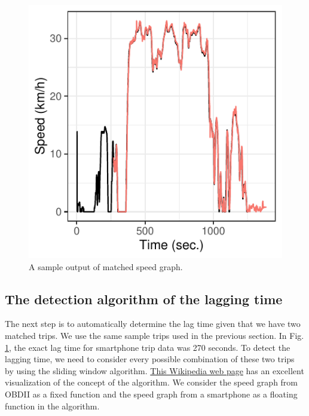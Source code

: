 \documentclass[letterpaper,9pt,twocolumn,twoside,]{pinp}
\begin{document}
\begin{figure}

{\centering \includegraphics{report_issaclee_files/figure-latex/speedplot-1} 

}

\caption{A sample output of matched speed graph.}\label{fig:speedplot}
\end{figure}

\hypertarget{the-detection-algorithm-of-the-lagging-time}{%
\subsection{The detection algorithm of the lagging
time}\label{the-detection-algorithm-of-the-lagging-time}}

The next step is to automatically determine the lag time given that we
have two matched trips. We use the same sample trips used in the
previous section. In Fig. \ref{fig:speedplot}, the exact lag time for
smartphone trip data was 270 seconds. To detect the lagging time, we
need to consider every possible combination of these two trips by using
the sliding window algorithm.
\href{https://en.wikipedia.org/wiki/Convolution\#/media/File:Convolution_of_spiky_function_with_box2.gif}{This
Wikipedia web page} has an excellent visualization of the concept of the
algorithm. We consider the speed graph from OBDII as a fixed function
and the speed graph from a smartphone as a floating function in the
algorithm.
\end{document}
